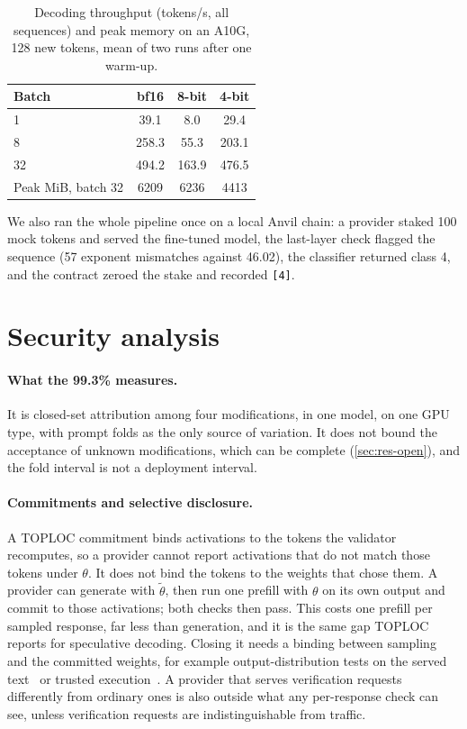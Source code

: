 \documentclass[11pt]{article}
\begin{document}
\begin{table}[!htb]
\centering
\small
\caption{Decoding throughput (tokens/s, all sequences) and peak memory on an A10G, 128 new tokens, mean of two runs after one warm-up.}
\label{tab:throughput}
\begin{tabular}{@{}lccc@{}}
\toprule
Batch & bf16 & 8-bit & 4-bit \\
\midrule
1  & 39.1 & 8.0   & 29.4 \\
8  & 258.3 & 55.3 & 203.1 \\
32 & 494.2 & 163.9 & 476.5 \\
\midrule
Peak MiB, batch 32 & 6209 & 6236 & 4413 \\
\bottomrule
\end{tabular}
\end{table}


We also ran the whole pipeline once on a local Anvil chain: a provider staked 100 mock tokens and served the fine-tuned model, the last-layer check flagged the sequence (57 exponent mismatches against 46.02), the classifier returned class 4, and the contract zeroed the stake and recorded \texttt{[4]}.

\section{Security analysis}
\label{sec:security}

\paragraph{What the 99.3\% measures.}
It is closed-set attribution among four modifications, in one model, on one GPU type, with prompt folds as the only source of variation.
It does not bound the acceptance of unknown modifications, which can be complete (\cref{sec:res-open}), and the fold interval is not a deployment interval.

\paragraph{Commitments and selective disclosure.}
A TOPLOC commitment binds activations to the tokens the validator recomputes, so a provider cannot report activations that do not match those tokens under $\theta$.
It does not bind the tokens to the weights that chose them.
A provider can generate with $\tilde\theta$, then run one prefill with $\theta$ on its own output and commit to those activations; both checks then pass.
This costs one prefill per sampled response, far less than generation, and it is the same gap TOPLOC reports for speculative decoding.
Closing it needs a binding between sampling and the committed weights, for example output-distribution tests on the served text~\cite{gao2025model} or trusted execution~\cite{cai2025auditing}.
A provider that serves verification requests differently from ordinary ones is also outside what any per-response check can see, unless verification requests are indistinguishable from traffic.
\end{document}
